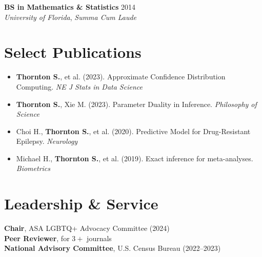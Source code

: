 \documentclass[10pt]{article}
\begin{document}
\noindent\textbf{BS in Mathematics \& Statistics} \hfill 2014 \\
\textit{University of Florida}, \textit{Summa Cum Laude} \\

\section*{Select Publications}
\begin{itemize}[leftmargin=*,topsep=2pt,itemsep=1pt]
    \item \textbf{Thornton S.}, et al. (2023). Approximate Confidence Distribution Computing. \textit{NE J Stats in Data Science}
    \item \textbf{Thornton S.}, Xie M. (2023). Parameter Duality in Inference. \textit{Philosophy of Science}
    \item Choi H., \textbf{Thornton S.}, et al. (2020). Predictive Model for Drug-Resistant Epilepsy. \textit{Neurology}
    \item Michael H., \textbf{Thornton S.}, et al. (2019). Exact inference for meta-analyses. \textit{Biometrics}
\end{itemize}

\section*{Leadership \& Service}
\textbf{Chair}, ASA LGBTQ+ Advocacy Committee (2024) \\
\textbf{Peer Reviewer}, for $3+$ journals \\
\textbf{National Advisory Committee}, U.S. Census Bureau (2022--2023)
\end{document}
